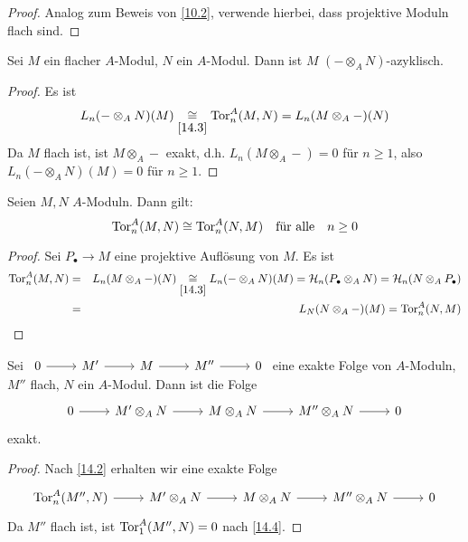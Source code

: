 \begin{proof}
	Analog zum Beweis von \ref{10.2}, verwende hierbei, dass projektive Moduln flach sind.
\end{proof}
\begin{fo}\label{14.4}
	Sei $M$ ein flacher $A$-Modul, $N$ ein $A$-Modul. Dann ist $M$ $(-\otimes_A N)$-azyklisch.
\end{fo}
\begin{proof}
	Es ist $$L_n(- \otimes_A N)(M) \underset{\ref{14.3}}{\cong} \text{Tor}_n^A(M,N) = L_n(M \otimes_A -)(N)$$
	Da $M$ flach ist, ist $M \otimes_A -$ exakt, d.h. $L_n(M \otimes_A -) = 0$ für $n\geq 1$, also $L_n(- \otimes_AN)(M) = 0$ für $n\geq 1$.
\end{proof}
\begin{fo}\label{14.5}
	Seien $M,N$ $A$-Moduln. Dann gilt: 
	$$\text{Tor}_n^A(M,N) \cong \text{Tor}_n^A(N,M) \quad \text{für alle}\quad n\geq 0$$
\end{fo}
\begin{proof}
	Sei $P_\bullet\to M$ eine projektive Auflösung von $M$. Es ist 
	\begin{eqnarray*}
	\text{Tor}_n^A(M,N) &=& L_n(M \otimes_A-)(N) \underset{\ref{14.3}}{\cong} L_n(- \otimes_A N)(M) = \mathcal{H}_n(P_\bullet \otimes_AN) = \mathcal{H}_n(N \otimes_AP_\bullet )\\
	&=& L_N(N \otimes_A-)(M) = \text{Tor}_n^A(N,M)
	\end{eqnarray*}
\end{proof}
\begin{bem}\label{14.6}
	Sei $\begin{tikzcd}
	0 \arrow{r} & M' \arrow{r} & M \arrow{r} & M'' \arrow{r} & 0
	\end{tikzcd}$ eine exakte Folge von $A$-Moduln, $M''$ flach, $N$ ein $A$-Modul. Dann ist die Folge
	$$\begin{tikzcd}
	0 \arrow{r} & M' \otimes_AN\arrow{r} & M \otimes_AN\arrow{r} & M'' \otimes_AN\arrow{r} & 0
	\end{tikzcd}$$
	exakt.
\end{bem}
\begin{proof}
	Nach \ref{14.2} erhalten wir eine exakte Folge 
	$$\begin{tikzcd}
	\Tor_n^A(M'',N) \arrow{r} & M' \otimes_A N \arrow{r} & M \otimes_A N \arrow{r} & M'' \otimes_AN\arrow{r} & 0
	\end{tikzcd}$$
	Da $M''$ flach ist, ist $\text{Tor}_1^A(M'', N) = 0$ nach \ref{14.4}.
\end{proof}
